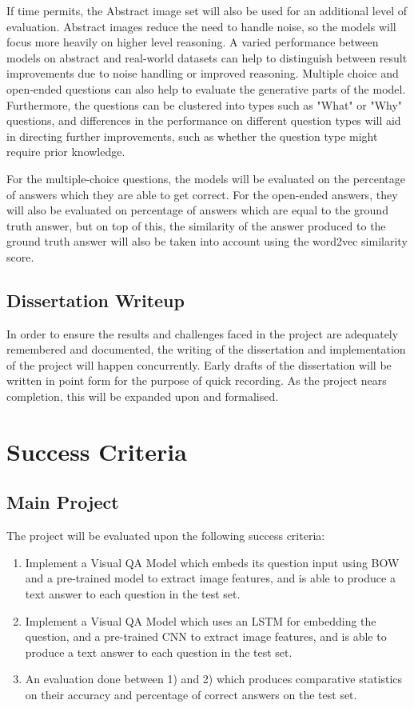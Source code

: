 \documentclass[12pt,a4paper,twoside]{article}
\begin{document}
If time permits, the Abstract image set will also be used for an additional level of evaluation. Abstract images reduce the need to handle noise, so the models will focus more heavily on higher level reasoning. A varied performance between models on abstract and real-world datasets can help to distinguish between result improvements due to noise handling or improved reasoning. Multiple choice and open-ended questions can also help to evaluate the generative parts of the model. Furthermore, the questions can be clustered into types such as "What" or "Why" questions, and differences in the performance on different question types will aid in directing further improvements, such as whether the question type might require prior knowledge.

For the multiple-choice questions, the models will be evaluated on the percentage of answers which they are able to get correct. For the open-ended answers, they will also be evaluated on percentage of answers which are equal to the ground truth answer, but on top of this, the similarity of the answer produced to the ground truth answer will also be taken into account using the word2vec similarity score.

\subsection{Dissertation Writeup}
In order to ensure the results and challenges faced in the project are adequately remembered and documented, the writing of the dissertation and implementation of the project will happen concurrently. Early drafts of the dissertation will be written in point form for the purpose of quick recording. As the project nears completion, this will be expanded upon and formalised.

\section{Success Criteria}
\subsection{Main Project}
The project will be evaluated upon the following success criteria:
\setlength{\parskip}{0em}
\begin{enumerate}
	\item Implement a Visual QA Model which embeds its question input using BOW and a pre-trained model to extract image features, and is able to produce a text answer to each question in the test set.
	\item Implement a Visual QA Model which uses an LSTM for embedding the question, and a pre-trained CNN to extract image features, and is able to produce a text answer to each question in the test set.
	\item An evaluation done between 1) and 2) which produces comparative statistics on their accuracy and percentage of correct answers on the test set.
\end{enumerate}
\setlength{\parskip}{1em}
\end{document}
